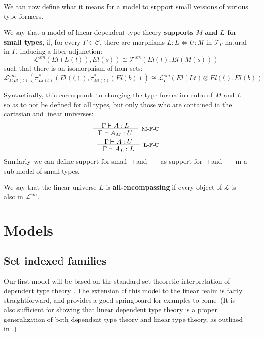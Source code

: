 We can now define what it means for a model to support small versions of various type formers. 
\begin{defn}
  We say that a model of linear dependent type theory \textbf{supports $M$ and $L$ for small types}, if, for every $\Gamma \in \mathcal{C}$, there are morphisms $L : L \iff U : M$ in $\mathcal{T}_\Gamma$ natural in $\Gamma$, inducing a fiber adjunction:
  \[
    \mathcal{L}^{sm}(El(L(t)), El(s)) \cong \mathcal{T}^{sm}(El(t), El(M(s)))
  \]
  such that there is an isomorphism of hom-sets:
  \[
    \mathcal{L}^{sm}_{\Gamma.El(t)}(\pi_{El(t)}^*(El(\xi)), \pi_{El(t)}^*(El(b))) \cong \mathcal{L}^{sm}_\Gamma(El(Lt) \otimes El(\xi), El(b))
  \]
\end{defn}
Syntactically, this corresponds to changing the type formation rules of $M$ and $L$ so as to not be defined for all types, but only those who are contained in the cartesian and linear universes:
\[
  \begin{split}
  \inference{\Gamma \vdash A : L}
  {\Gamma \vdash A_M : U}[M-F-U]
  \\
  \inference{\Gamma \vdash A : U}
  {\Gamma \vdash A_L : L}[L-F-U]
  \end{split}
\]
Similarly, we can define support for small $\sqcap$ and $\sqsubset$ as support for $\sqcap$ and $\sqsubset$ in a sub-model of small types.
\begin{defn}
  We say that the linear universe $L$ is \textbf{all-encompassing} if every object of $\mathcal{L}$ is also in $\mathcal{L}^{sm}$.
\end{defn}
\newpage
\section{Models}\label{models}
\subsection{Set indexed families}
Our first model will be based on the standard set-theoretic interpretation of dependent type theory \cite{hofmann1997syntax}. The extension of this model to the linear realm is fairly straightforward, and provides a good springboard for examples to come. (It is also sufficient for showing that linear dependent type theory is a proper generalization of both dependent type theory and linear type theory, as outlined in \cite{vakar14}.)

